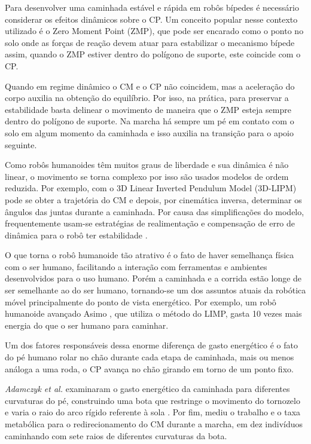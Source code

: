 Para desenvolver uma caminhada estável e rápida em robôs bípedes é necessário considerar os efeitos dinâmicos sobre o CP. Um conceito popular nesse contexto  utilizado é o Zero Moment Point (ZMP), que pode ser encarado  como o ponto no solo onde as forças de reação devem atuar para estabilizar o mecanismo bípede \cite{vukobratovic2004} assim, quando o ZMP estiver dentro do polígono de suporte, este coincide com o CP.

Quando em regime dinâmico o CM e o CP não coincidem, mas a aceleração do corpo auxilia na obtenção do equilíbrio. Por isso, na prática, para preservar a estabilidade basta delinear o movimento de maneira que o ZMP esteja sempre dentro do polígono de suporte. Na marcha há sempre um pé em contato com o solo em algum momento da caminhada e isso auxilia na transição para o apoio seguinte.

Como robôs humanoides têm muitos graus de liberdade e sua dinâmica é não linear, o movimento se torna complexo por isso são usados modelos de ordem reduzida.  Por exemplo, com o 3D Linear Inverted Pendulum Model (3D-LIPM)\cite{kajita2001} pode se obter a trajetória do CM e depois, por cinemática inversa, determinar os ângulos das juntas durante a caminhada. Por causa das simplificações do modelo, frequentemente usam-se estratégias de realimentação e compensação de erro de dinâmica para o robô ter estabilidade \cite{yoshiike2009}.


O que torna o robô humanoide tão atrativo é o fato de haver semelhança física com o ser humano, facilitando a interação com ferramentas e ambientes desenvolvidos para o uso humano. Porém a caminhada e a corrida estão longe de ser semelhante ao do ser humano, tornando-se um dos assuntos atuais da robótica móvel principalmente do ponto de vista energético. Por exemplo,  um  robô humanoide  avançado Asimo \cite{yoshiike2009}, que  utiliza o método do LIMP, gasta 10 vezes mais energia do que o ser humano \cite{tedrake2005} para caminhar.  

Um dos fatores responsáveis dessa enorme diferença de gasto energético é o fato do pé humano rolar no chão durante  cada etapa de caminhada, mais ou menos análoga a uma roda, o CP avança no chão girando em torno de um ponto fixo. 

\textit{Adamczyk et al.} examinaram o gasto energético da caminhada para diferentes curvaturas do pé, construindo uma bota que restringe o movimento do tornozelo e varia o raio do arco rígido referente à sola \cite{adamczyk2006}. Por fim, mediu  o trabalho e o taxa metabólica para o redirecionamento do CM durante a marcha, em dez indivíduos caminhando com sete raios de diferentes curvaturas da bota.

